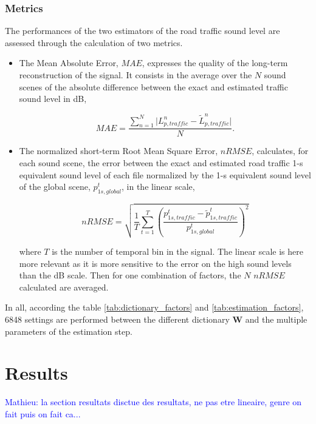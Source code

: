 \documentclass[twocolumn,a4paper,10pt]{article}
\newcommand{\ml}[1]{\textcolor{blue}{ Mathieu: #1}}
\begin{document}
\subsubsection{Metrics}
The performances of the two estimators of the road traffic sound level are assessed through the calculation of two metrics.

\begin{itemize}

\item The Mean Absolute Error, $MAE$, expresses the quality of the long-term reconstruction of the signal. It consists in the average over the $N$ sound scenes of the absolute difference between the exact and estimated traffic sound level in dB,

\begin{equation}
MAE = \frac{\sum_{n = 1}^N\vert L^n_{p,traffic}-\tilde{L}^n_{p,traffic} \vert}{N}.
\end{equation}

\item The normalized short-term Root Mean Square Error, $nRMSE$, calculates, for each sound scene, the error between the exact and estimated road traffic 1-s equivalent sound level of each file normalized by the 1-s equivalent sound level of the global scene, $p^t_{1s,global}$, in the linear scale,

\begin{equation}
nRMSE = \sqrt{\frac{1}{T}\sum_{t = 1}^T \left(\frac{p^t_{1s,traffic}-\tilde{p}^t_{1s,traffic}}{p^t_{1s,global}}\right)^2}
\end{equation}

where $T$ is the number of temporal bin in the signal. The linear scale is here more relevant as it is more sensitive to the error on the high sound levels than the dB scale. Then for one combination of factors, the $N$ $nRMSE$ calculated are averaged.\\
\end{itemize}

In all, according the table \ref{tab:dictionary_factors} and \ref{tab:estimation_factors}, 6848 settings are performed between the different dictionary $\mathbf{W}$ and the multiple parameters of the estimation step.

\section{Results}\label{part:results}

\ml{la section resultats disctue des resultats, ne pas etre lineaire, genre on fait  puis on fait ca...}
\end{document}
